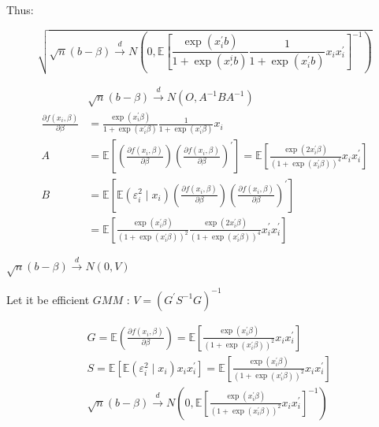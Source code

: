 {{\begin{enumerate}[label=(\arabic*)]
{Thus:

$$
\sqrt{\sqrt{n}(b-\beta) \xrightarrow{d} N\left(0, \mathbb{E}\left[\frac{\exp \left(x_{i}^{\prime} b\right)}{1+\exp \left(x_{\prime}^{i} b\right)} \frac{1}{1+\exp \left(x_{i}^{\prime} b\right)} x_{i} x_{i}^{\prime}\right]^{-1}\right)}
$$
}
{\item 
$$
\begin{aligned}
& \sqrt{n}(b-\beta) \xrightarrow{d} N\left(O, A^{-1} B A^{-1}\right) \\
\frac{\partial f\left(x_{i}, \beta\right)}{\partial \beta} &= \frac{\exp \left(x_{i}^{\prime} \beta\right)}{1+\exp \left(x_{i}^{\prime} \beta\right)} \frac{1}{1+\exp \left(x_{i}^{\prime} \beta\right)} x_{i} \\
A &= \mathbb{E}\left[\left(\frac{\partial f\left(x_{i}, \beta\right)}{\partial \beta}\right)\left(\frac{\partial f\left(x_{i}, \beta\right)}{\partial \beta}\right)^{\prime}\right]=\mathbb{E}\left[\frac{\exp \left(2 x_{i}^{\prime} \beta\right)}{\left(1+\exp \left(x_{i}^{\prime} \beta\right)\right)^{4}} x_{i} x_{i}^{\prime}\right] \\
B &= \mathbb{E}\left[\mathbb{E}\left(\varepsilon_{i}^{2} \mid x_{i}\right)\left(\frac{\partial f\left(x_{i}, \beta\right)}{\partial \beta}\right)\left(\frac{\partial f\left(x_{i}, \beta\right)}{\partial \beta}\right)^{\prime}\right] \\
& =\mathbb{E}\left[\frac{\exp \left(x_{i}^{\prime} \beta\right)}{\left(1+\exp \left(x_{i}^{\prime} \beta\right)\right)^{2}} \frac{\exp \left(2 x_{i}^{\prime} \beta\right)}{\left(1+\exp \left(x_{i}^{\prime} \beta\right)\right)^{4}} x_{i}^{\prime} x_{i}^{\prime}\right]
\end{aligned}
$$
}
{\item 
$\sqrt{n}(b-\beta) \xrightarrow{d} N(0, V)$

Let it be efficient $G M M$ : $V=\left(G^{\prime} S^{-1} G\right)^{-1}$

$$
\begin{aligned}
& G=\mathbb{E}\left(\frac{\partial f\left(x_{i}, \beta\right)}{\partial \beta}\right)=\mathbb{E}\left[\frac{\exp \left(x_{i}^{\prime} \beta\right)}{\left(1+\exp \left(x_{i}^{\prime} \beta\right)\right)^{2}} x_{i} x_{i}^{\prime}\right] \\
& S=\mathbb{E}\left[\mathbb{E}\left(\varepsilon_{i}^{2} \mid x_{i}\right) x_{i} x_{i}^{\prime}\right]=\mathbb{E}\left[\frac{\exp \left(x_{i}^{\prime} \beta\right)}{\left(1+\exp \left(x_{i}^{\prime} \beta\right)\right)^{2}} x_{i} x_{i}^{\prime}\right] \\
& \sqrt{n}(b-\beta) \xrightarrow{d} N\left(0, \mathbb{E}\left[\frac{\exp \left(x_{i}^{\prime} \beta\right)}{\left(1+\exp \left(x_{i}^{\prime} \beta\right)\right)^{2}} x_{i} x_{i}^{\prime}\right]^{-1}\right)
\end{aligned}
$$

}
\end{enumerate}}}
